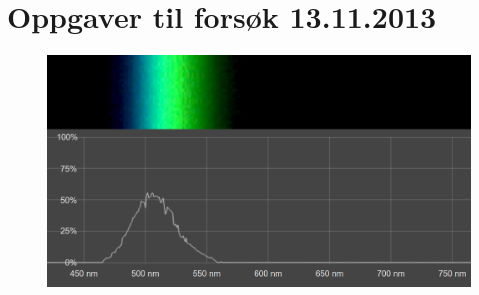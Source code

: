 
\chapter{Oppgaver til forsøk 13.11.2013}
\begin{figure}[H]
\centering
\includegraphics[width=\textwidth]{img/photosynthesis/spectrometer.png}
\end{figure}
